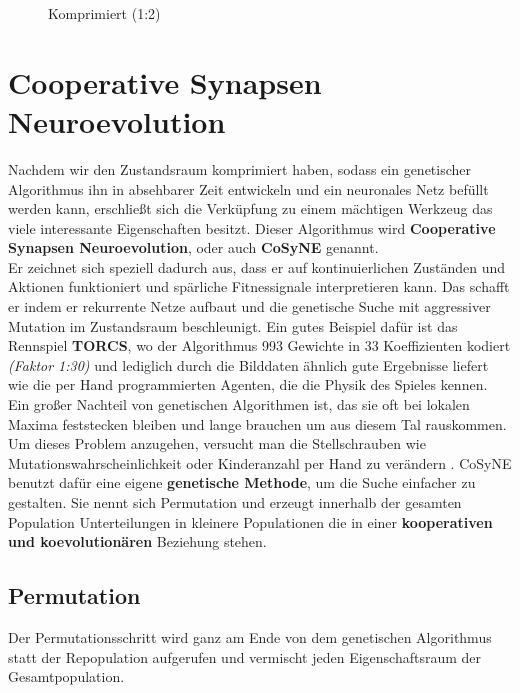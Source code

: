\begin{multicols}{2}
\begin{figure}[H]
\begin{center}
                        \caption{Komprimiert (1:2)}\label{fig:dct-after}
                    \end{center}
                \end{figure}
            \end{multicols}

    \section{Cooperative Synapsen Neuroevolution} \label{cosyne-definition}
        Nachdem wir den Zustandsraum komprimiert haben, sodass ein genetischer Algorithmus ihn in absehbarer Zeit entwickeln und ein neuronales Netz befüllt werden kann, erschließt sich die Verküpfung zu einem mächtigen Werkzeug das viele interessante Eigenschaften besitzt. Dieser Algorithmus wird \textbf{Cooperative Synapsen Neuroevolution}\cite{cosyne2}, oder auch \textbf{CoSyNE} genannt.\\

        \noindent
        Er zeichnet sich speziell dadurch aus, dass er auf kontinuierlichen Zuständen und Aktionen funktioniert und spärliche Fitnessignale interpretieren kann. Das schafft er indem er rekurrente Netze aufbaut und die genetische Suche mit aggressiver Mutation im Zustandsraum beschleunigt. Ein gutes Beispiel dafür ist das Rennspiel \textbf{TORCS}\cite{cosyne3}, wo der Algorithmus 993 Gewichte in 33 Koeffizienten kodiert \textit{(Faktor 1:30)} und lediglich durch die Bilddaten ähnlich gute Ergebnisse liefert wie die per Hand programmierten Agenten, die die Physik des Spieles kennen.\\

        \noindent
        Ein großer Nachteil von genetischen Algorithmen ist, das sie oft bei lokalen Maxima feststecken bleiben und lange brauchen um aus diesem Tal rauskommen. Um dieses Problem anzugehen, versucht man die Stellschrauben wie Mutationswahrscheinlichkeit oder Kinderanzahl per Hand zu verändern \cite{grefenstette86}. CoSyNE benutzt dafür eine eigene \textbf{genetische Methode}, um die Suche einfacher zu gestalten. Sie nennt sich Permutation und erzeugt innerhalb der gesamten Population Unterteilungen in kleinere Populationen die in einer \textbf{kooperativen und koevolutionären} Beziehung stehen.
        \subsection{Permutation}
            Der Permutationsschritt wird ganz am Ende von dem genetischen Algorithmus statt der Repopulation aufgerufen und vermischt jeden \colorbox{green!25}{Eigenschaftsraum} der Gesamtpopulation. 

